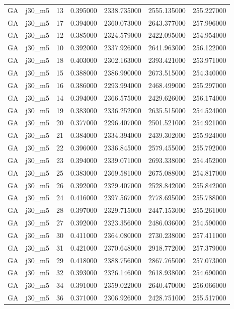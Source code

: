 \begin{tabular}{llrrrrr}
GA & j30_m5 & 13 & 0.395000 & 2338.735000 & 2555.135000 & 255.227000 \\
GA & j30_m5 & 17 & 0.394000 & 2360.073000 & 2643.377000 & 257.996000 \\
GA & j30_m5 & 12 & 0.385000 & 2324.579000 & 2422.095000 & 254.954000 \\
GA & j30_m5 & 10 & 0.392000 & 2337.926000 & 2641.963000 & 256.122000 \\
GA & j30_m5 & 18 & 0.403000 & 2302.163000 & 2393.421000 & 253.971000 \\
GA & j30_m5 & 15 & 0.388000 & 2386.990000 & 2673.515000 & 254.340000 \\
GA & j30_m5 & 16 & 0.386000 & 2293.994000 & 2468.499000 & 255.297000 \\
GA & j30_m5 & 14 & 0.394000 & 2366.575000 & 2429.626000 & 256.174000 \\
GA & j30_m5 & 19 & 0.383000 & 2336.252000 & 2635.515000 & 254.524000 \\
GA & j30_m5 & 20 & 0.377000 & 2296.407000 & 2501.521000 & 254.921000 \\
GA & j30_m5 & 21 & 0.384000 & 2334.394000 & 2439.302000 & 255.924000 \\
GA & j30_m5 & 22 & 0.396000 & 2336.845000 & 2579.455000 & 255.792000 \\
GA & j30_m5 & 23 & 0.394000 & 2339.071000 & 2693.338000 & 254.452000 \\
GA & j30_m5 & 25 & 0.383000 & 2369.581000 & 2675.088000 & 254.817000 \\
GA & j30_m5 & 26 & 0.392000 & 2329.407000 & 2528.842000 & 255.842000 \\
GA & j30_m5 & 24 & 0.416000 & 2397.567000 & 2778.695000 & 255.788000 \\
GA & j30_m5 & 28 & 0.397000 & 2329.715000 & 2447.153000 & 255.261000 \\
GA & j30_m5 & 27 & 0.392000 & 2323.356000 & 2486.036000 & 254.590000 \\
GA & j30_m5 & 30 & 0.411000 & 2364.080000 & 2730.238000 & 257.411000 \\
GA & j30_m5 & 31 & 0.421000 & 2370.648000 & 2918.772000 & 257.379000 \\
GA & j30_m5 & 29 & 0.418000 & 2388.756000 & 2867.765000 & 257.073000 \\
GA & j30_m5 & 32 & 0.393000 & 2326.146000 & 2618.938000 & 254.690000 \\
GA & j30_m5 & 34 & 0.391000 & 2359.022000 & 2640.470000 & 256.066000 \\
GA & j30_m5 & 36 & 0.371000 & 2306.926000 & 2428.751000 & 255.517000 \\

\end{tabular}
